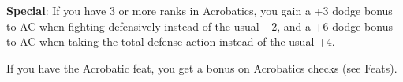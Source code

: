 \textbf{Special}: If you have 3 or more ranks in Acrobatics, you gain a +3 dodge bonus to AC when fighting defensively instead of the usual +2, and a +6 dodge bonus to AC when taking the total defense action instead of the usual +4.
				
If you have the Acrobatic feat, you get a bonus on Acrobatics checks (see Feats).
        	
